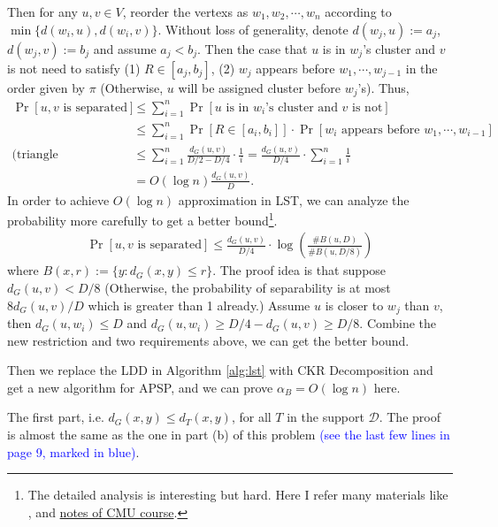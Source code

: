 \begin{answer}
\begin{enumerate}[label=\alph*).]
        Then for any $u, v \in V$, reorder the vertexs as $w_1, w_2, \cdots, w_n$ according to $\min\{d(w_i, u), d(w_i, v)\}$.
        Without loss of generality, denote $d(w_j, u) := a_j$, $d(w_j, v) := b_j$ and assume $a_j < b_j$.
        Then the case that $u$ is in $w_j$'s cluster and $v$ is not need to satisfy (1) $R \in [a_j, b_j]$, (2) $w_j$ appears before $w_{1}, \cdots, w_{j-1}$ in the order given by $\pi$ (Otherwise, $u$ will be assigned cluster before $w_j$'s). Thus, 
        \begin{align*}
            \Pr\left[u,v \text{ is separated}\right] &\le \sum_{i=1}^{n} \Pr\left[ \text{$u$ is in $w_i$'s cluster and $v$ is not}\right] \\
            &\le \sum_{i=1}^{n} \Pr\left[R \in [a_i, b_i]\right] \cdot \Pr\left[\text{$w_i$ appears before $w_{1}, \cdots, w_{i-1}$}\right] \\
            \text{(triangle inequality.)} &\le \sum_{i=1}^{n} \frac{d_G(u, v)}{D/2 - D/4} \cdot \frac{1}{i} = \frac{d_G(u, v)}{D/4} \cdot \sum_{i=1}^{n} \frac{1}{i} \\
            &= O(\log n)\frac{d_G(u, v)}{D}.
        \end{align*}
        In order to achieve $O(\log n)$ approximation in LST, we can analyze the probability more carefully to get a better bound\footnote{The detailed analysis is interesting but hard. Here I refer many materials like \cite{CKR_Decomposition}, \cite{mendel2009fastckrpartitionssparse} and \href{https://www.cs.cmu.edu/~15850/}{notes of CMU course}.}. 
        \begin{align}
            \label{eq:ckr-separation}
            \Pr[u, v \text{ is separated}] \le \frac{d_G(u,v)}{D/4} \cdot \log\left(\frac{\# B(u, D)}{\# B(u, D/8)}\right)
        \end{align}
        where $B(x, r):= \{y: d_G(x,y) \le r\}$. The proof idea is that suppose $d_G(u,v) < D/8$ (Otherwise, the probability of separability is at most $8d_G(u,v)/D$ which is greater than 1 already.)
        Assume $u$ is closer to $w_j$ than $v$, then $d_G(u, w_i) \le D$ and $d_G(u, w_i) \ge D/4 - d_G(u, v) \ge D/8$. Combine the new restriction and two requirements above, we can get the better bound.

        Then we replace the LDD in Algorithm \ref{alg:lst} with CKR Decomposition and get a new algorithm for APSP, and we can prove $\alpha_B = O(\log n)$ here.

        The first part, i.e. $d_G(x, y) \le d_T(x, y)$, for all $T$ in the support $\mathcal{D}$. The proof is almost the same as the one in part (b) of this problem \textcolor{blue}{(see the last few lines in page 9, marked in blue)}.


\end{enumerate}
\end{answer}
